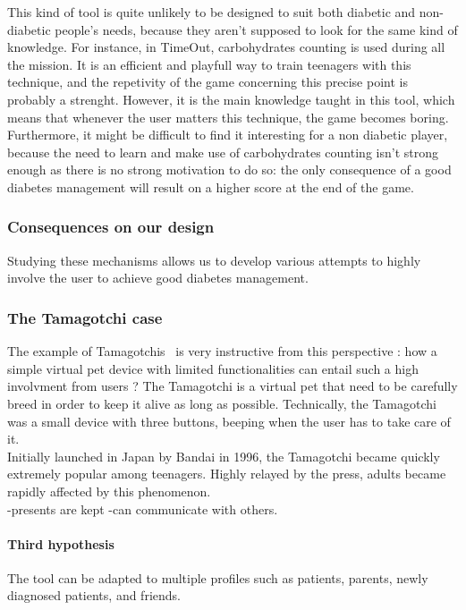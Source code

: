 \documentclass[12pt,MSc]{muthesis}
\begin{document}
This kind of tool is quite unlikely to be designed to suit both diabetic and non-diabetic people's needs, because they aren't supposed to look for the same kind of knowledge. For instance, in TimeOut, carbohydrates counting is used during all the mission. It is an efficient and playfull way to train teenagers with this technique, and the repetivity of the game concerning this precise point is probably a strenght. However, it is the main knowledge taught in this tool, which means that whenever the user matters this technique, the game becomes boring. Furthermore, it might be difficult to find it interesting for a non diabetic player, because the need to learn and make use of carbohydrates counting isn't strong enough as there is no strong motivation to do so: the only consequence of a good diabetes management will result on a higher score at the end of the game.\\

\subsubsection{Consequences on our design}
Studying these mechanisms allows us to develop various attempts to highly involve the user to achieve good diabetes management. 

\subsubsection{The Tamagotchi case}
The example of Tamagotchis~\cite{holzinger2001triangle} is very instructive from this perspective : how a simple virtual pet device with limited functionalities can entail such a high involvment from users ? The Tamagotchi is a virtual pet that need to be carefully breed in order to keep it alive as long as possible. Technically, the Tamagotchi was a small device with three buttons, beeping when the user has to take care of it. \\
Initially launched in Japan by Bandai in 1996, the Tamagotchi became quickly extremely popular among teenagers. Highly relayed by the press, adults became rapidly affected by this phenomenon.\\

-presents are kept
-can communicate with others.
\fi 

\paragraph{Third hypothesis}%
The tool can be adapted to multiple profiles such as patients, parents, newly diagnosed patients, and friends. 
\end{document}
